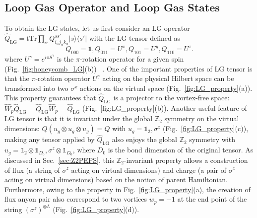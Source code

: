 \documentclass{ntuthesis}
\begin{document}
\subsection{Loop Gas Operator and Loop Gas States}
To obtain the LG states, let us first consider an LG operator
 $\hat{Q}_{\text{LG}} = \text{tTr}\prod_\alpha {Q}^{ss'}_{i_\alpha j_\alpha k_\alpha}|s\rangle \langle s'| $ with the LG tensor defined as
\begin{equation}
Q_{000} = \mathbb{1}, Q_{011} = U^x, Q_{101} = U^y, Q_{110} = U^z.
\end{equation}
where $U^\gamma = e^{i \pi S^\gamma}$ is the $\pi$-rotation operator for a given spin (Fig.~\ref{fig:honeycomb_LG}(b)) ~\cite{lee2020anisotropy}. One of the important properties of LG tensor is that the $\pi$-rotation operator $U^\gamma$ acting on the physical Hilbert space can be transformed into two $\sigma^x$ actions on the virtual space (Fig.~\ref{fig:LG_property}(a)). This property  guarantees that $\hat{Q}_{\text{LG}}$ is a projector to the vortex-free space: $\hat{W}_p\hat{Q}_{\text{LG}} = \hat{Q}_{\text{LG}}\hat{W}_p = \hat{Q}_{\text{LG}}$ (Fig.~\ref{fig:LG_property}(b)). 
Another useful feature of LG tensor is that it is invariant under the global $ \mathbb{Z}_2$ symmetry on the virtual dimensions: $Q(u_g \otimes u_g \otimes u_g) = Q $ with $u_g = \mathbb{1}_2, {\sigma}^z$ (Fig.~\ref{fig:LG_property}(c)), making any tensor applied by $\hat{Q}_{\text{LG}}$ also enjoys the global $\mathbb{Z}_2$ symmetry with $u_g = \mathbb{1}_2 \otimes \mathbb{1}_{D_0}, {\sigma}^z \otimes \mathbb{1}_{D_0}$, where $D_0$ is the bond dimension of the original tensor. 
%
As discussed in Sec.~\ref{sec:Z2PEPS}, this $\mathbb{Z}_2$-invariant property allows a construction of flux (a string of $\sigma^z$ acting on virtual dimensions) and charge (a pair of $\sigma^x$ acting on virtual dimensions) based on the notion of parent Hamiltonian. Furthermore, owing to the property in Fig.~\ref{fig:LG_property}(a), the creation of flux anyon pair also correspond to two vortices $w_p = -1$ at the end point of the string $(\sigma^z)^{\otimes L}$ (Fig.~\ref{fig:LG_property}(d)).
\end{document}

